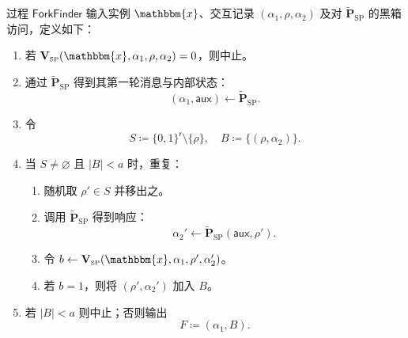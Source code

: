 \documentclass[american,singlepageview]{snargs-book-zh}
\newcommand{\Bits}{\{0,1\}}
\newcommand{\Malicious}[1]{\tilde{#1}}
\newcommand{\DefineEqual}{\coloneqq}
\newcommand{\AuxiliaryState}{\mathsf{aux}}
\newcommand{\Instance}{\mathbbm{x}}
\newcommand{\ProtoProver}{P}
\newcommand{\ProtoVerifier}{V}
\newcommand{\ProtoRandomnessComplexity}{\mathsf{r}}
\newcommand{\SPSubscript}{\scriptscriptstyle\mathrm{SP}}
\newcommand{\SPFormat}[1]{\mathbf{#1}}
\newcommand{\SPVerifier}{\SPFormat{\ProtoVerifier}_{\SPSubscript}}
\newcommand{\SPMaliciousProver}{\Malicious{\SPFormat{\ProtoProver}}_{\SPSubscript}}
\newcommand{\SPCommitment}{\alpha_{1}}
\newcommand{\SPChallenge}{\rho}
\newcommand{\SPResponse}{\alpha_{2}}
\newcommand{\SPRandomnessComplexity}{\ProtoRandomnessComplexity}
\newcommand{\SSArity}{a}
\newcommand{\SSFork}{F}
\newcommand{\SSForkFinder}{\mathsf{ForkFinder}}
\newcommand{\SSRemainingRandomness}{S}
\newcommand{\SSBranches}{B}
\begin{document}
\begin{construction}
\label{construction:ss-fork-finder}
过程 $\SSForkFinder$ 输入实例 $\Instance$、交互记录 $(\SPCommitment,\SPChallenge,\SPResponse)$ 及对 $\SPMaliciousProver$ 的黑箱访问，定义如下：
\begin{enumerate}[nolistsep]
  \item 若 $\SPVerifier(\Instance,\SPCommitment,\SPChallenge,\SPResponse)=0$，则中止。
  \item 通过 $\SPMaliciousProver$ 得到其第一轮消息与内部状态：
    \[
      (\SPCommitment,\AuxiliaryState)\gets\SPMaliciousProver.
    \]
  \item 令
    \[
      \SSRemainingRandomness
      \DefineEqual
      \Bits^{\SPRandomnessComplexity}\setminus\{\SPChallenge\},
      \quad
      \SSBranches\DefineEqual\{(\SPChallenge,\SPResponse)\}.
    \]
  \item 当 $\SSRemainingRandomness\neq\varnothing$ 且 $|\SSBranches|<\SSArity$ 时，重复：
  \begin{enumerate}[nolistsep]
    \item 随机取 $\SPChallenge'\in\SSRemainingRandomness$ 并移出之。
    \item 调用 $\SPMaliciousProver$ 得到响应：
      \[
        \SPResponse'\gets\SPMaliciousProver(\AuxiliaryState,\SPChallenge').
      \]
    \item 令 $b\gets\SPVerifier(\Instance,\SPCommitment,\SPChallenge',\SPResponse')$。
    \item 若 $b=1$，则将 $(\SPChallenge',\SPResponse')$ 加入 $\SSBranches$。
  \end{enumerate}
  \item 若 $|\SSBranches|<\SSArity$ 则中止；否则输出
    \[
      \SSFork\DefineEqual(\SPCommitment,\SSBranches).
    \]
\end{enumerate}
\end{construction}
\end{document}
